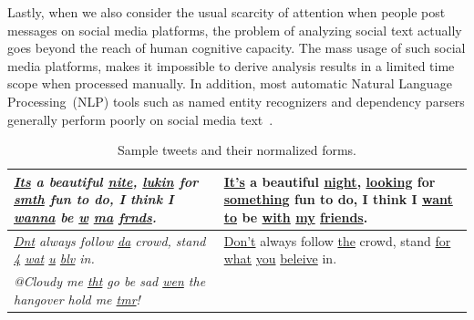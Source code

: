 \documentclass[a4paper,onesided,12pt]{report}
\begin{document}
Lastly, when we also consider the usual scarcity of attention when people post messages on social media platforms, the problem of analyzing social text actually goes beyond the reach of human cognitive capacity. The mass usage of such social media platforms, makes it impossible to derive analysis results in a limited time scope when processed manually. In addition, most automatic Natural Language Processing~(NLP) tools such as named entity recognizers and  dependency parsers generally perform poorly on social media text~\cite{ritter2010unsupervised}.

\begin{table}[hbp]
\caption[Sample tweets and their normalized forms.]{Sample tweets and their normalized forms.}
\label{tab:sentences}
\begin{tabular}{|>{\itshape}p{7cm}|p{7cm}|}
\hline
\underline{Its} a beautiful \underline{nite}, \underline{lukin} for \underline{smth} fun to do, I think I \underline{wanna} be \underline{w} \underline{ma} \underline{frnds}. &
\underline{It’s} a beautiful \underline{night}, \underline{looking} for \underline{something} fun to do, I think I \underline{want to} be \underline{with} \underline{my} \underline{friends}. \\
\hline
\underline{Dnt} always follow \underline{da} crowd, stand \underline{4} \underline{wat} \underline{u} \underline{blv} in. &
\underline{Don't} always follow \underline{the} crowd, stand \underline{for} \underline{what} \underline{you} \underline{beleive} in. \\
\hline
@Cloudy me \underline{tht} go be sad \underline{wen} the hangover hold me \underline{tmr}! &


\end{tabular}
\end{table}
\end{document}
